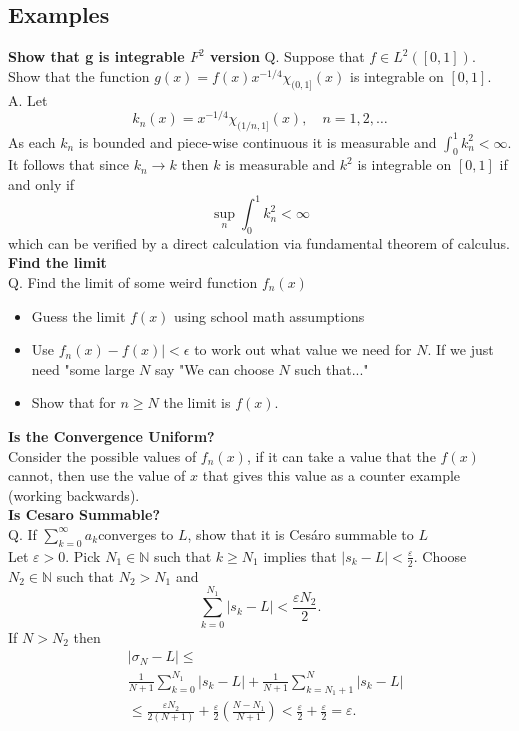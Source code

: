 \documentclass[a4paper, 10pt]{article}
\begin{document}
\begin{multicols*}{3}
\section*{Examples}
\textbf{Show that g is integrable $F^2$ version}
Q. Suppose that $f \in L^2([0,1])$. Show that the function $g(x)=f(x) x^{-1 / 4} \chi_{(0,1]}(x)$ is integrable on $[0,1]$.\\
A. Let
$$
k_n(x)=x^{-1 / 4} \chi_{(1 / n, 1]}(x), \quad n=1,2, \ldots
$$
As each $k_n$ is bounded and piece-wise continuous it is measurable and $\int_0^1 k_n^2<\infty$. It follows that since $k_n \rightarrow k$ then $k$ is measurable and $k^2$ is integrable on $[0,1]$ if and only if
$$
\sup _n \int_0^1 k_n^2<\infty
$$
which can be verified by a direct calculation via fundamental theorem of calculus. \\

\textbf{Find the limit}\\
Q. Find the limit of some weird function $f_n(x)$
\begin{itemize}[label=\textbullet, labelsep=0.3em, leftmargin=1em]
\item Guess the limit $f(x)$ using school math assumptions
\item Use ${f_n(x) - f(x)|<\epsilon}$ to work out what value we need for $N$. If we just need "some large $N$ say "We can choose $N$ such that..."
\item Show that for $n\geq N$ the limit is $f(x)$.
\end{itemize}

\textbf{Is the Convergence Uniform?}\\
Consider the possible values of $f_n(x)$, if it can take a value that the $f(x)$ cannot, then use the value of $x$ that gives this value as a counter example (working backwards). \\

\textbf{Is Cesaro Summable?}\\
Q. If $\sum_{k=0}^{\infty} a_k$converges to $L$, show that it is Cesáro summable to $L$\\	 
Let $\varepsilon>0$. Pick $N_1 \in \mathbb{N}$ such that $k \geq N_1$ implies that $\left|s_k-L\right|<\frac{\varepsilon}{2}$. Choose $N_2 \in \mathbb{N}$ such that $N_2>N_1$ and
$$
\sum_{k=0}^{N_1}\left|s_k-L\right|<\frac{\varepsilon N_2}{2} .
$$
If $N>N_2$ then
$$
\begin{aligned}
&\left|\sigma_N-L\right|\leq\\
&\frac{1}{N+1} \sum_{k=0}^{N_1}\left|s_k-L\right|+\frac{1}{N+1} \sum_{k=N_1+1}^N\left|s_k-L\right| \\
& \leq \frac{\varepsilon N_2}{2(N+1)}+\frac{\varepsilon}{2}\left(\frac{N-N_1}{N+1}\right)<\frac{\varepsilon}{2}+\frac{\varepsilon}{2}=\varepsilon .
\end{aligned}
$$


\end{multicols*}
\end{document}
